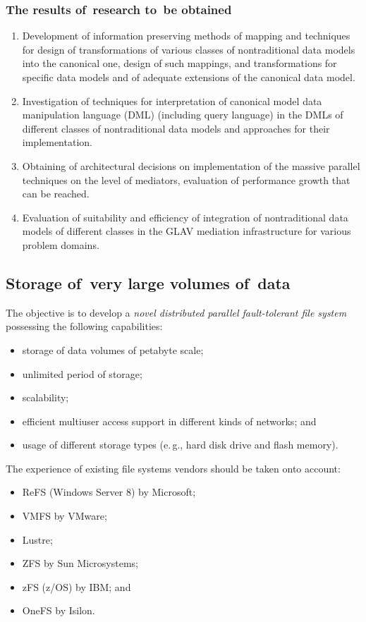 \begin{multicols}{2}
\subsubsection{The results of~research to~be obtained}

\noindent
\begin{enumerate}[1.]
\item Development of information preserving methods of mapping and techniques for design of 
transformations of various classes of nontraditional data models into the canonical one, design 
of such mappings, and transformations for specific data models and of adequate extensions of 
the canonical data model.
\item Investigation of techniques for interpretation of canonical model 
data manipulation language (DML) (including query 
language) in the DMLs of different classes of nontraditional data models and approaches for 
their implementation.
\item Obtaining of architectural decisions on implementation of the massive parallel techniques 
on the level of mediators, evaluation of performance growth that can be reached.
\item Evaluation of suitability and efficiency of integration of nontraditional data models of 
different classes in the GLAV mediation infrastructure for various problem domains.
\end{enumerate}

\subsection{Storage of~very large volumes of~data}

\noindent
The objective is to develop a \textit{novel distributed parallel fault-tolerant file system} possessing 
the following capabilities:
\begin{itemize}
\item storage of data volumes of petabyte scale;
\item unlimited period of storage;
\item scalability;
\item efficient multiuser access support in different kinds of networks; and
\item usage of different storage types (e.\,g., hard disk drive and flash memory).
\end{itemize}

The experience of existing file systems vendors should be taken onto account:
\begin{itemize}
\item ReFS (Windows Server 8) by Microsoft;
\item VMFS by VMware;
\item Lustre;
\item ZFS by Sun Microsystems;
\item zFS (z/OS) by IBM; and
\item OneFS by Isilon.
\end{itemize}


\end{multicols}
